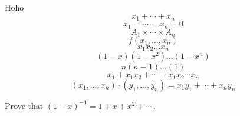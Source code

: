 
\bye




































































































\hsize 29pc
Hoho
$$x_1+\cdots+x_n$$
$$x_1=\cdots=x_n=0$$
$$A_1\times\cdots\times A_n$$
$$f(x_1,\ldots,x_n)$$
$$x_1x_2\ldots x_n$$
$$(1-x)(1-x^2)\ldots(1-x^n)$$
$$n(n-1)\ldots(1)$$
$$x_1+x_1x_2+\cdots+x_1x_2\cdots x_n$$
$$(x_1,\ldots,x_n)\cdot(y_1,\ldots,y_n)=x_1y_1+\cdots+x_ny_n$$

Prove that $(1-x)^{-1}=1+x+x^2+\cdots\,$.

